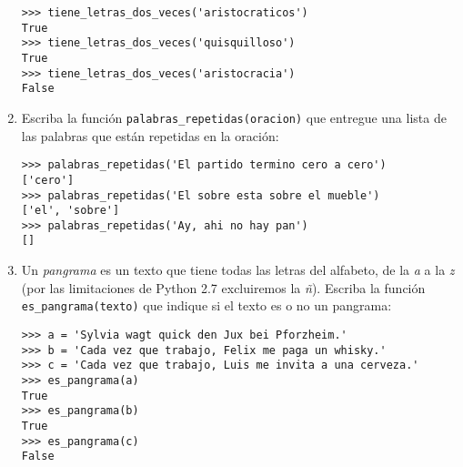 \begin{enumerate}
\begin{lstlisting}
>>> tiene_letras_dos_veces('aristocraticos')
True
>>> tiene_letras_dos_veces('quisquilloso')
True
>>> tiene_letras_dos_veces('aristocracia')
False
\end{lstlisting}
\item
  Escriba la función \lstinline!palabras_repetidas(oracion)! que
  entregue una lista de las palabras que están repetidas en la oración:

\begin{lstlisting}
>>> palabras_repetidas('El partido termino cero a cero')
['cero']
>>> palabras_repetidas('El sobre esta sobre el mueble')
['el', 'sobre']
>>> palabras_repetidas('Ay, ahi no hay pan')
[]
\end{lstlisting}
\item
  Un \emph{pangrama} es un texto que tiene todas las letras del
  alfabeto, de la \emph{a} a la \emph{z}
  (por las limitaciones de Python 2.7 excluiremos la \emph{ñ}).
  Escriba la función \lstinline!es_pangrama(texto)!
  que indique si el texto es o no un pangrama:

\begin{lstlisting}
>>> a = 'Sylvia wagt quick den Jux bei Pforzheim.'
>>> b = 'Cada vez que trabajo, Felix me paga un whisky.'
>>> c = 'Cada vez que trabajo, Luis me invita a una cerveza.'
>>> es_pangrama(a)
True
>>> es_pangrama(b)
True
>>> es_pangrama(c)
False
\end{lstlisting}
\end{enumerate}
